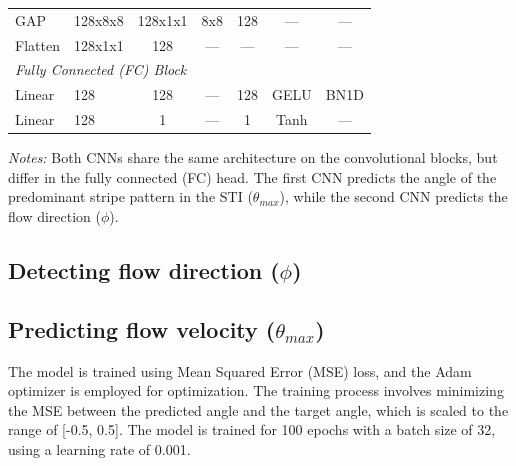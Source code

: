 \documentclass[12pt]{elsarticle}
\begin{document}
\begin{table}[!htbp]
{\begin{tabular}{llccccc}
        GAP  & 128x8x8             & 128x1x1             & 8x8     & 128           & ---   & ---     \\
        Flatten                   & 128x1x1             & 128                 & ---     & ---           & ---  & ---       \\
        \midrule
        \multicolumn{6}{l}{\textit{Fully Connected (FC) Block}} \\
        Linear                    & 128                 & 128                 & ---     & 128           & GELU    & BN1D   \\
        Linear                    & 128                 & 1                   & ---     & 1             & Tanh  & ---      \\
        \bottomrule
    \end{tabular}
    } %
    \par\medskip\footnotesize
    \textit{Notes:} Both CNNs share the same architecture on the convolutional blocks, but differ in the fully connected (FC) head. The first CNN predicts the angle of the predominant stripe pattern in the STI ($\theta_{max}$), while the second CNN predicts the flow direction ($\phi$). 
\end{table}

\subsection{Detecting flow direction ($\phi$)}


\subsection{Predicting flow velocity ($\theta_{max}$)}
The model is trained using Mean Squared Error (MSE) loss, and the Adam optimizer is employed for optimization. The training process involves minimizing the MSE between the predicted angle and the target angle, which is scaled to the range of [-0.5, 0.5]. The model is trained for 100 epochs with a batch size of 32, using a learning rate of 0.001.


\newpage

\end{document}
